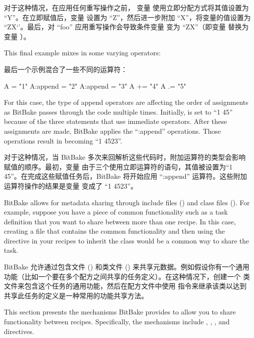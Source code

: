 对于这种情况，在应用任何重写操作之前， 变量  使用立即分配方式将其值设置为 ``Y''。在立即赋值后，变量 设置为 ``Z''，然后进一步附加 ``X''，将变量的值设置为 ``ZX‘’。最后，对 ``foo'' 应用重写操作会导致条件变量  变为 ``ZX''（即变量  替换为变量 ）。

This final example mixes in some varying operators:

最后一个示例混合了一些不同的运算符：

\begin{pyglist}
A = "1"
A:append = "2"
A:append = "3"
A += "4"
A .= "5"
\end{pyglist}

For this case, the type of append operators are affecting the order of assignments as BitBake passes through the code multiple times. Initially,  is set to ``1 45'' because of the three statements that use immediate operators. After these assignments are made, BitBake applies the ``:append'' operations. Those operations result in  becoming ``1 4523''.

对于这种情况，当 BitBake 多次来回解析这些代码时，附加运算符的类型会影响赋值的顺序。最初，变量  由于三个使用立即运算符的语句，其值被设置为``1 45''。在完成这些赋值任务后，BitBake 将开始应用 ``:append'' 运算符。这些附加运算符操作的结果是变量  变成了 ``1 4523''。


BitBake allows for metadata sharing through include files () and class files (). For example, suppose you have a piece of common functionality such as a task definition that you want to share between more than one recipe. In this case, creating a  file that contains the common functionality and then using the  directive in your recipes to inherit the class would be a common way to share the task.

BitBake 允许通过包含文件 () 和类文件 () 来共享元数据。例如假设你有一个通用功能（比如一个要在多个配方之间共享的任务定义）。在这种情况下，创建一个  类文件来包含这个任务的通用功能，然后在配方文件中使用  指令来继承该类以达到共享此任务的定义是一种常用的功能共享方法。

This section presents the mechanisms BitBake provides to allow you to share functionality between recipes. Specifically, the mechanisms include , , , and  directives.

